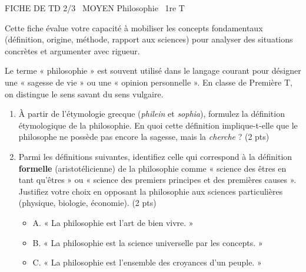 \documentclass[11pt]{article}
\begin{document}
\begin{tcolorbox}[enhanced,colback=popink,colframe=popink,arc=10pt,boxrule=0pt,left=12pt,right=12pt,top=9pt,bottom=9pt]
{\color{white}\popxbold\small FICHE DE TD 2/3 \textbullet\ MOYEN \hfill Philosophie \textbullet\ 1re T\par}
\end{tcolorbox}
\vspace{4pt}
\noindent Cette fiche évalue votre capacité à mobiliser les concepts fondamentaux (définition, origine, méthode, rapport aux sciences) pour analyser des situations concrètes et argumenter avec rigueur.

\begin{exercice}
Le terme « philosophie » est souvent utilisé dans le langage courant pour désigner une « sagesse de vie » ou une « opinion personnelle ». En classe de Première T, on distingue le sens savant du sens vulgaire.
\begin{enumerate}
    \item À partir de l'étymologie grecque (\textit{philein} et \textit{sophia}), formulez la définition étymologique de la philosophie. En quoi cette définition implique-t-elle que le philosophe ne possède pas encore la sagesse, mais la \textit{cherche} ? (2 pts)
    \item Parmi les définitions suivantes, identifiez celle qui correspond à la définition \textbf{formelle} (aristotélicienne) de la philosophie comme « science des êtres en tant qu'êtres » ou « science des premiers principes et des premières causes ». Justifiez votre choix en opposant la philosophie aux sciences particulières (physique, biologie, économie). (2 pts)
    \begin{itemize}
        \item A. « La philosophie est l'art de bien vivre. »
        \item B. « La philosophie est la science universelle par les concepts. »
        \item C. « La philosophie est l'ensemble des croyances d'un peuple. »
    \end{itemize}
\end{enumerate}
\end{exercice}
\end{document}
